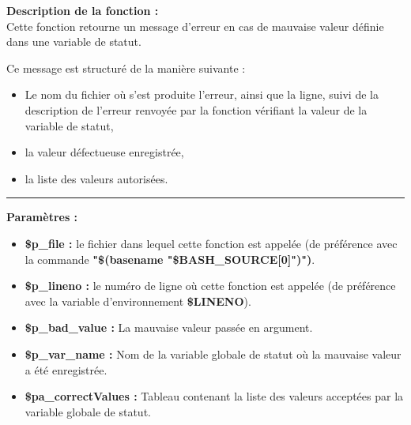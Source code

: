 \documentclass[a4paper,10pt]{article}
\begin{document}
\begin{justify}
\textbf{Description de la fonction :}\\[1\baselineskip]
    Cette fonction retourne un message d'erreur en cas de mauvaise valeur définie dans une variable de statut.
\end{justify}

\begin{justify}
   	Ce message est structuré de la manière suivante :

   	\begin{itemize}
   		\item Le nom du fichier où s'est produite l'erreur, ainsi que la ligne, suivi de la description de l'erreur renvoyée par la fonction vérifiant la valeur de la variable de statut,\setlength{\parskip}{1em}

   		\item la valeur défectueuse enregistrée,

   		\item la liste des valeurs autorisées.
   	\end{itemize}
\end{justify}


\par\noindent\rule{\textwidth}{0.4pt}

\begin{justify}
    \textbf{Paramètres :}
    \begin{itemize}
        \item \textbf{\color{orange}\$p\_file\color{white} :} le fichier dans lequel cette fonction est appelée (de préférence avec la commande \textbf{\textbf{"\$(\color{gray}basename \color{white}"\color{orange}\$BASH\_SOURCE[0]\color{white}")")}}.\setlength{\parskip}{1em}

        \item \textbf{\color{orange}\$p\_lineno\color{white} :} le numéro de ligne où cette fonction est appelée (de préférence avec la variable d'environnement \textbf{\color{orange}\$LINENO}).

        \item \textbf{\color{orange}\$p\_bad\_value\color{white} :} La mauvaise valeur passée en argument\color{white}.

        \item \textbf{\color{orange}\$p\_var\_name\color{white} :}  Nom de la variable globale de statut où la mauvaise valeur a été enregistrée.\color{white}

        \item \textbf{\color{orange}\$pa\_correctValues\color{white} :} Tableau contenant la liste des valeurs acceptées par la variable globale de statut.
    \end{itemize}
\end{justify}\setlength{\parskip}{2em}
\end{document}
